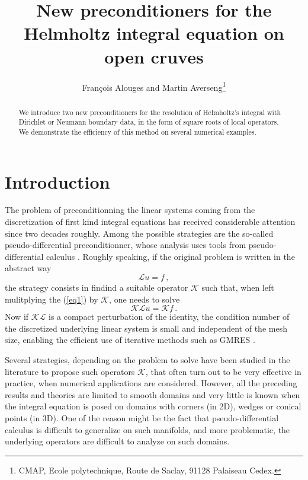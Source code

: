 \documentclass[a4paper]{article}
\title{New preconditioners for the Helmholtz integral equation on open cruves}
\author{Fran\c{c}ois Alouges and Martin Averseng\footnote{CMAP, Ecole polytechnique, Route de Saclay, 91128 Palaiseau Cedex.}}
\begin{document}
\maketitle

\begin{abstract}
	We introduce two new preconditioners for the resolution of Helmholtz's integral with Dirichlet or Neumann boundary data, in the form of square roots of local operators. We demonstrate the efficiency of this method on several numerical examples. 
\end{abstract}

\section*{Introduction}

The problem of preconditionning the linear systems coming from the discretization of first kind integral equations
has received considerable attention since two decades roughly. Among the possible strategies are the so-called pseudo-differential preconditionner, whose analysis uses tools from pseudo-differential calculus \cite{christiansen2002preconditioner,Nedelec,Levadoux}. Roughly speaking, if the original problem is written in the abstract way
\begin{equation}
	\mathcal{L}u=f\,,
	\label{eq1}
\end{equation}
the strategy consists in findind a suitable operator $\mathcal{K}$ such
that, when left mulitplying the (\ref{eq1}) by $\mathcal{K}$, one needs to solve
\begin{equation}
	\mathcal{K}\mathcal{L}u=\mathcal{K}f\,.	
\end{equation}
Now if $\mathcal{K}\mathcal{L}$ is a compact perturbation of the identity, the condition number of the discretized underlying linear system is small and independent of the mesh size, enabling the efficient use of iterative methods such as GMRES \cite{gmres}.

Several strategies, depending on the problem to solve have been studied in the literature \cite{} to propose such operators $\mathcal{K}$, that often turn out to be very effective in practice, when numerical applications are considered. However, all the preceding results and theories are limited to smooth domains and very little is known when the integral equation 
is posed on domains with corners (in 2D), wedges or conical points (in 3D). One of the reason might be the fact that pseudo-differential calculus is difficult to generalize on such manifolds, and more problematic, the underlying operators are difficult to analyze on such domains.
\end{document}
